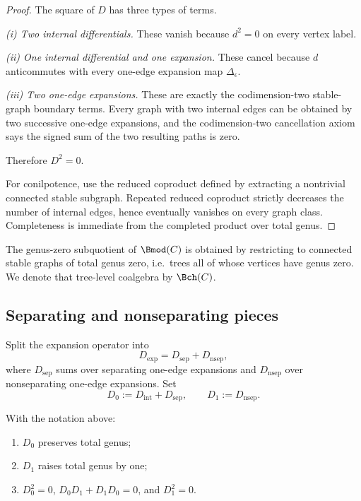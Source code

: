 \begin{proof}
The square of $D$ has three types of terms.

\smallskip
\noindent
\emph{(i) Two internal differentials.}
These vanish because $d^2=0$ on every vertex label.

\smallskip
\noindent
\emph{(ii) One internal differential and one expansion.}
These cancel because $d$ anticommutes with every one-edge expansion map $\Delta_\epsilon$.

\smallskip
\noindent
\emph{(iii) Two one-edge expansions.}
These are exactly the codimension-two stable-graph boundary terms. Every graph with two
internal edges can be obtained by two successive one-edge expansions, and the codimension-two
cancellation axiom says the signed sum of the two resulting paths is zero.

Therefore $D^2=0$.

For conilpotence, use the reduced coproduct defined by extracting a nontrivial connected
stable subgraph. Repeated reduced coproduct strictly decreases the number of internal
edges, hence eventually vanishes on every graph class. Completeness is immediate from
the completed product over total genus.
\end{proof}

\begin{remark}
The genus-zero subquotient of $\Bmod(C)$ is obtained by restricting to connected stable
graphs of total genus zero, i.e.\ trees all of whose vertices have genus zero. We denote
that tree-level coalgebra by $\Bch(C)$.
\end{remark}

\subsection{Separating and nonseparating pieces}

Split the expansion operator into
\[
D_{\mathrm{exp}}=D_{\mathrm{sep}}+D_{\mathrm{nsep}},
\]
where $D_{\mathrm{sep}}$ sums over separating one-edge expansions and $D_{\mathrm{nsep}}$
over nonseparating one-edge expansions. Set
\[
D_0:=D_{\mathrm{int}}+D_{\mathrm{sep}},
\qquad
D_1:=D_{\mathrm{nsep}}.
\]

\begin{proposition}\label{prop:D0D1}
With the notation above:
\begin{enumerate}[leftmargin=2.4em]
\item $D_0$ preserves total genus;
\item $D_1$ raises total genus by one;
\item $D_0^2=0$, $D_0D_1+D_1D_0=0$, and $D_1^2=0$.
\end{enumerate}
\end{proposition}

